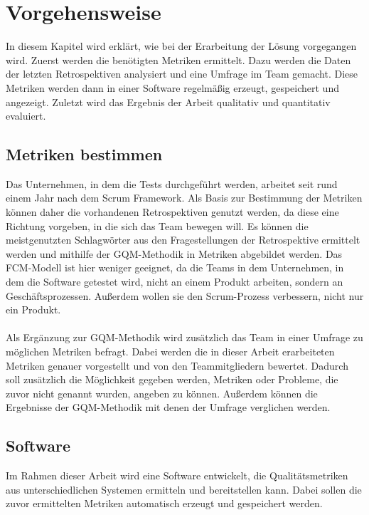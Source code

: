\chapter{Vorgehensweise}

In diesem Kapitel wird erklärt, wie bei der Erarbeitung der Lösung vorgegangen wird.
Zuerst werden die benötigten Metriken ermittelt.
Dazu werden die Daten der letzten Retrospektiven analysiert und eine Umfrage im Team gemacht.
Diese Metriken werden dann in einer Software regelmäßig erzeugt, gespeichert und angezeigt.
Zuletzt wird das Ergebnis der Arbeit qualitativ und quantitativ evaluiert.

\section{Metriken bestimmen}

Das Unternehmen, in dem die Tests durchgeführt werden, arbeitet seit rund einem Jahr nach dem Scrum Framework.
Als Basis zur Bestimmung der Metriken können daher die vorhandenen Retrospektiven genutzt werden, da diese eine Richtung vorgeben, in die sich das Team bewegen will.
Es können die meistgenutzten Schlagwörter aus den Fragestellungen der Retrospektive ermittelt werden und mithilfe der \ac{GQM}-Methodik in Metriken abgebildet werden.
Das \ac{FCM}-Modell ist hier weniger geeignet, da die Teams in dem Unternehmen, in dem die Software getestet wird, nicht an einem Produkt arbeiten, sondern an Geschäftsprozessen.
Außerdem wollen sie den Scrum-Prozess verbessern, nicht nur ein Produkt.
\\
\\
Als Ergänzung zur \ac{GQM}-Methodik wird zusätzlich das Team in einer Umfrage zu möglichen Metriken befragt.
Dabei werden die in dieser Arbeit erarbeiteten Metriken genauer vorgestellt und von den Teammitgliedern bewertet.
Dadurch soll zusätzlich die Möglichkeit gegeben werden, Metriken oder Probleme, die zuvor nicht genannt wurden, angeben zu können.
Außerdem können die Ergebnisse der \ac{GQM}-Methodik mit denen der Umfrage verglichen werden.

\clearpage
\section{Software}

Im Rahmen dieser Arbeit wird eine Software entwickelt, die Qualitätsmetriken aus unterschiedlichen Systemen ermitteln und bereitstellen kann.
Dabei sollen die zuvor ermittelten Metriken automatisch erzeugt und gespeichert werden.

